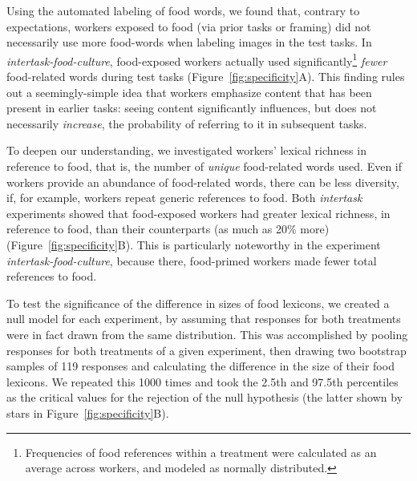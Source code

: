 \documentclass{sigchi}
\begin{document}
Using the automated labeling of food words, we found that, contrary to
expectations,
workers exposed to food (via prior tasks or framing) did not necessarily
use more food-words when labeling images in the test tasks.
In \textit{intertask-food-culture}, food-exposed
workers actually used significantly\footnote{
  Frequencies of food references within a treatment were calculated as
  an average across workers, and modeled as normally distributed.
} \textit{fewer} food-related words 
during test tasks (Figure~\ref{fig:specificity}A).  This finding
rules out a seemingly-simple idea that workers emphasize
content that has been present in earlier tasks: seeing content 
significantly influences, but does not necessarily 
\textit{increase}, the probability of referring to it in subsequent tasks.

To deepen our understanding, we investigated workers' lexical richness in 
reference to food, that is, the number of \textit{unique} food-related words
used.  Even if workers provide an abundance of food-related words, there
can be less diversity, if, for example, workers repeat generic references 
to food.
Both \textit{intertask} experiments showed that food-exposed workers had 
greater lexical richness, in reference to food, than their counterparts 
(as much as 20\% more) (Figure~\ref{fig:specificity}B).  
This is particularly noteworthy in the experiment
\textit{intertask-food-culture}, because there,
food-primed workers made fewer total references to food.  

To test the significance of the difference in sizes of food
lexicons,
we created a null model for each experiment, by assuming that
responses for both treatments were in fact drawn from the same 
distribution.
This was accomplished by pooling responses for both treatments 
of a given experiment, then 
drawing two bootstrap samples of 119 responses and calculating
the difference in the size of their food lexicons.  
We repeated this 1000 times and took the 2.5th and 97.5th percentiles 
as the critical values for the rejection of the null hypothesis 
(the latter shown by stars in Figure~\ref{fig:specificity}B).
\end{document}
